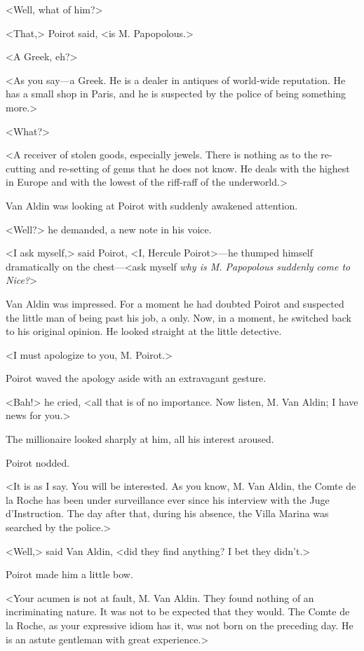 <Well, what of him?>

<That,> Poirot said, <is M. Papopolous.>

<A Greek, eh?>

<As you say—a Greek. He is a dealer in antiques of world-wide reputation. He has a small shop in Paris, and he is suspected by the police of being something more.>

<What?>

<A receiver of stolen goods, especially jewels. There is nothing as to the re-cutting and re-setting of gems that he does not know. He deals with the highest in Europe and with the lowest of the riff-raff of the underworld.>

Van Aldin was looking at Poirot with suddenly awakened attention.

<Well?> he demanded, a new note in his voice.

<I ask myself,> said Poirot, <I, Hercule Poirot>—he thumped himself dramatically on the chest—<ask myself \emph{why is M. Papopolous suddenly come to Nice?}>

Van Aldin was impressed. For a moment he had doubted Poirot and suspected the little man of being past his job, a  only. Now, in a moment, he switched back to his original opinion. He looked straight at the little detective.

<I must apologize to you, M. Poirot.>

Poirot waved the apology aside with an extravagant gesture.

<Bah!> he cried, <all that is of no importance. Now listen, M. Van Aldin; I have news for you.>

The millionaire looked sharply at him, all his interest aroused.

Poirot nodded.

<It is as I say. You will be interested. As you know, M. Van Aldin, the Comte de la Roche has been under surveillance ever since his interview with the Juge d'Instruction. The day after that, during his absence, the Villa Marina was searched by the police.>

<Well,> said Van Aldin, <did they find anything? I bet they didn't.>

Poirot made him a little bow.

<Your acumen is not at fault, M. Van Aldin. They found nothing of an incriminating nature. It was not to be expected that they would. The Comte de la Roche, as your expressive idiom has it, was not born on the preceding day. He is an astute gentleman with great experience.>

